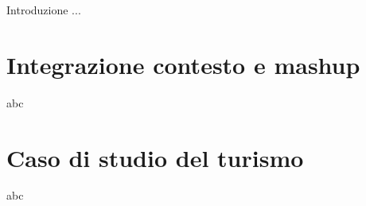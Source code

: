 Introduzione ...

\section{Integrazione contesto e mashup}

abc

\section{Caso di studio del turismo}

abc